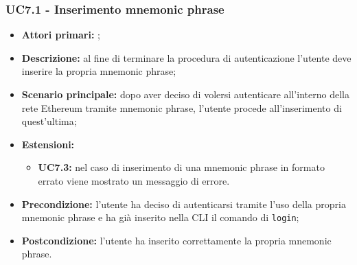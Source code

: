 \subsubsection{UC7.1 - Inserimento mnemonic phrase}
\begin{itemize}
	\item \textbf{Attori primari:} \una{};
	\item \textbf{Descrizione:} al fine di terminare la procedura di autenticazione l’utente deve inserire la propria mnemonic phrase; 
	\item \textbf{Scenario principale:} dopo aver deciso di volersi autenticare all’interno della rete Ethereum tramite mnemonic phrase, l'utente procede all’inserimento di quest’ultima;  
	\item \textbf{Estensioni:} 
	\begin{itemize}
		\item \textbf{UC7.3:} nel caso di inserimento di una mnemonic phrase in formato errato viene mostrato un messaggio di errore. 
	\end{itemize}
	\item \textbf{Precondizione:} l’utente ha deciso di autenticarsi tramite l’uso della propria mnemonic phrase e ha già inserito nella CLI il comando di \texttt{login};
	\item \textbf{Postcondizione:} l’utente ha inserito correttamente la propria mnemonic phrase. 
\end{itemize}